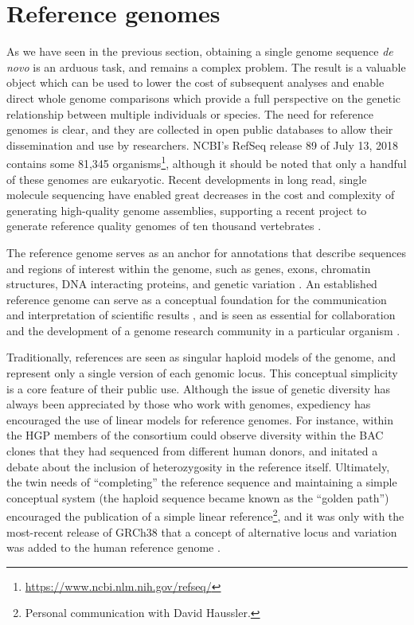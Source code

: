 \section{Reference genomes}

As we have seen in the previous section, obtaining a single genome sequence \emph{de novo} is an arduous task, and remains a complex problem.
The result is a valuable object which can be used to lower the cost of subsequent analyses and enable direct whole genome comparisons which provide a full perspective on the genetic relationship between multiple individuals or species.
The need for reference genomes is clear, and they are collected in open public databases to allow their dissemination and use by researchers.
NCBI's RefSeq release 89 of July 13, 2018 contains some 81,345 organisms\footnote{\url{https://www.ncbi.nlm.nih.gov/refseq/}}, although it should be noted that only a handful of these genomes are eukaryotic.
Recent developments in long read, single molecule sequencing have enabled great decreases in the cost and complexity of generating high-quality genome assemblies, supporting a recent project to generate reference quality genomes of ten thousand vertebrates \cite{genome2009genome,koepfli2015genome}.

The reference genome serves as an anchor for annotations that describe sequences and regions of interest within the genome, such as genes, exons, chromatin structures, DNA interacting proteins, and genetic variation \cite{sherry2001dbsnp,quinlan2010bedtools,encode2012integrated}.
An established reference genome can serve as a conceptual foundation for the communication and interpretation of scientific results \cite{kent2002human}, and is seen as essential for collaboration and the development of a genome research community in a particular organism \cite{smith1998functional,cherry1998sgd}.

Traditionally, references are seen as singular haploid models of the genome, and represent only a single version of each genomic locus.
This conceptual simplicity is a core feature of their public use.
Although the issue of genetic diversity has always been appreciated by those who work with genomes, expediency has encouraged the use of linear models for reference genomes.
For instance, within the HGP members of the consortium could observe diversity within the BAC clones that they had sequenced from different human donors, and initated a debate about the inclusion of heterozygosity in the reference itself.
Ultimately, the twin needs of ``completing'' the reference sequence and maintaining a simple conceptual system (the haploid sequence became known as the ``golden path'') encouraged the publication of a simple linear reference\footnote{Personal communication with David Haussler.}, and it was only with the most-recent release of GRCh38 that a concept of alternative locus and variation was added to the human reference genome \cite{schneider2017evaluation}.

